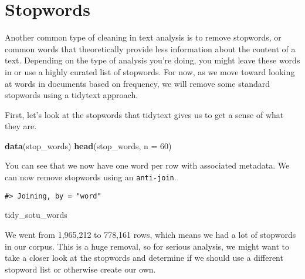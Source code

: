 \documentclass[]{book}
\newenvironment{Shaded}{\begin{snugshade}}{\end{snugshade}}
\newcommand{\DataTypeTok}[1]{\textcolor[rgb]{0.13,0.29,0.53}{#1}}
\newcommand{\DecValTok}[1]{\textcolor[rgb]{0.00,0.00,0.81}{#1}}
\newcommand{\KeywordTok}[1]{\textcolor[rgb]{0.13,0.29,0.53}{\textbf{#1}}}
\newcommand{\NormalTok}[1]{#1}
\newcommand{\OperatorTok}[1]{\textcolor[rgb]{0.81,0.36,0.00}{\textbf{#1}}}
\newcommand{\StringTok}[1]{\textcolor[rgb]{0.31,0.60,0.02}{#1}}
\begin{document}
\hypertarget{stopwords}{%
\section{Stopwords}\label{stopwords}}

Another common type of cleaning in text analysis is to remove stopwords, or common words that theoretically provide less information about the content of a text. Depending on the type of analysis you're doing, you might leave these words in or use a highly curated list of stopwords. For now, as we move toward looking at words in documents based on frequency, we will remove some standard stopwords using a tidytext approach.

First, let's look at the stopwords that tidytext gives us to get a sense of what they are.

\begin{Shaded}
\begin{Highlighting}[]
\KeywordTok{data}\NormalTok{(stop_words)}
\KeywordTok{head}\NormalTok{(stop_words, }\DataTypeTok{n =} \DecValTok{60}\NormalTok{)}
\end{Highlighting}
\end{Shaded}

You can see that we now have one word per row with associated metadata. We can now remove stopwords using an \texttt{anti-join}.

\begin{Shaded}
\end{Shaded}

\begin{verbatim}
#> Joining, by = "word"
\end{verbatim}

\begin{Shaded}
\begin{Highlighting}[]
\NormalTok{tidy_sotu_words}
\end{Highlighting}
\end{Shaded}

We went from 1,965,212 to 778,161 rows, which means we had a lot of stopwords in our corpus. This is a huge removal, so for serious analysis, we might want to take a closer look at the stopwords and determine if we should use a different stopword list or otherwise create our own.
\end{document}
